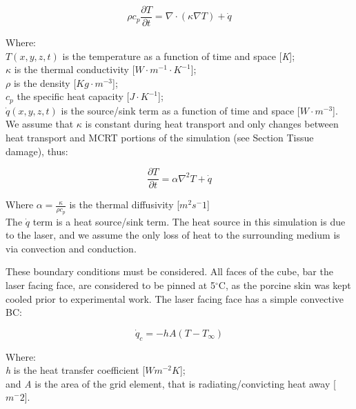 \begin{equation}
\rho c_p \frac{\partial T}{\partial t}= \nabla \cdot (\kappa \nabla T) + \dot{q}
\label{eqn:heat}
\end{equation}

\noindent Where:\\
	\indent $T(x, y, z, t)$ is the temperature as a function of time and space [\textit{K}];\\
	\indent $\kappa$ is the thermal conductivity [$W\cdot m^{-1}\cdot K^{-1}$];\\ 
	\indent $\rho$ is the density [$Kg \cdot m^{-3}$];\\
	\indent $c_p$ the specific heat capacity [$J\cdot K^{-1}$];\\
	\indent $\dot{q}(x,y,z,t)$ is the source/sink term as a function of time and space [$W\cdot m^{-3}$].\\
	
We assume that $\kappa$	is constant during heat transport and only changes between heat transport and MCRT portions of the simulation (see Section Tissue damage), thus:

\begin{equation}
\frac{\partial T}{\partial t}= \alpha \nabla^2 T + \dot{q}
\label{eqn:heatreal}
\end{equation}
	
Where $\alpha = \tfrac{\kappa}{\rho c_p}$ is the thermal diffusivity [$m^2 s^-{1}$]	\\
	
The $\dot{q}$ term is a heat source/sink term. The heat source in this simulation is due to the laser, and we assume the only loss of heat to the surrounding medium is via convection and conduction.
	
These boundary conditions must be considered. All faces of the cube, bar the laser facing face, are considered to be pinned at 5$^{\circ}$C, as the porcine skin was kept cooled prior to experimental work. The laser facing face has a simple convective BC:	

\begin{equation}
\dot{q}_c = -hA(T - T_\infty)
\label{eqn:bceqns}
\end{equation}

\noindent Where:\\
	\indent \textit{h} is the heat transfer coefficient [$W m^{-2} K$];\\
	\indent and \textit{A} is the area of the grid element, that is radiating/convicting heat away [$m^-{2}$].\\

